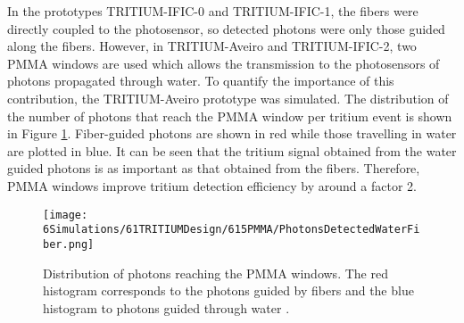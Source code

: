 In the prototypes TRITIUM-IFIC-0 and TRITIUM-IFIC-1, the fibers were directly coupled to the photosensor, so detected photons were only those guided along the fibers. However, in TRITIUM-Aveiro and TRITIUM-IFIC-2, two PMMA windows are used which allows the transmission to the photosensors of photons propagated through water. To quantify the importance of this contribution, the TRITIUM-Aveiro prototype was simulated. The distribution of the number of photons that reach the PMMA window per tritium event is shown in Figure \ref{fig:PMMAEffect}. Fiber-guided photons are shown in red while those travelling in water are plotted in blue. It can be seen that the tritium signal obtained from the water guided photons is as important as that obtained from the fibers. Therefore, PMMA windows improve tritium detection efficiency by around a factor 2.

\begin{figure}[hbtp]
\centering
\texttt{[image: 6Simulations/61TRITIUMDesign/615PMMA/PhotonsDetectedWaterFiber.png]}
\caption{Distribution of photons reaching the PMMA windows. The red histogram corresponds to the photons guided by fibers and the blue histogram to photons guided through water \cite{SimulationPaperCarlos}.\label{fig:PMMAEffect}}
\end{figure}

